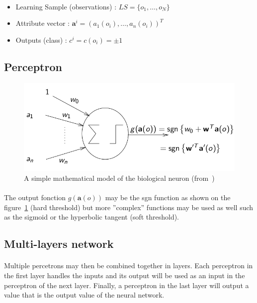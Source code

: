 \documentclass[a4paper,12pt]{article}
\begin{document}
\paragraph{}
\begin{itemize}
\item Learning Sample (observations) : $LS = \{o_1, \ldots, o_N \}$
\item Attribute vector : $\mathbf{a}^i = (a_1(o_i), \ldots, a_n(o_i))^T$
\item Outputs (class) : $c^i = c(o_i) = \pm 1$
\end{itemize}

\subsection{Perceptron}

\begin{figure}[H]
\centering
\includegraphics[scale=0.5]{Images/perceptron.png}
\caption{A simple mathematical model of the biological neuron (from~\cite{Wehenkel2005})}
\label{perceptron}
\end{figure}

\paragraph{}
The output fonction $g(\mathbf{a}(o))$ may be the sgn function as shown on the figure~\ref{perceptron} (hard threshold) but more ''complex'' functions may be used as well such as the sigmoid or the hyperbolic tangent (soft threshold).

\subsection{Multi-layers network}

\paragraph{}
Multiple percetrons may then be combined together in layers. Each perceptron in the first layer handles the inputs and its output will be used as an input in the perceptron of the next layer. Finally, a perceptron in the last layer will output a value that is the output value of the neural network.
\end{document}
